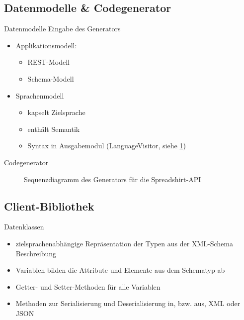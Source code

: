 \subsection{Datenmodelle \& Codegenerator}
\begin{frame}{Datenmodelle}
    Eingabe des Generators
    \begin{itemize}
        \item Applikationsmodell:
        \begin{itemize}
            \item REST-Modell
            \item Schema-Modell
        \end{itemize}
        \item Sprachenmodell
        \begin{itemize}
            \item kapselt Zielsprache
            \item enthält Semantik
            \item Syntax in Ausgabemodul (LanguageVisitor, siehe \cref{sequence})
        \end{itemize}
    \end{itemize}
\end{frame}

\begin{frame}{Codegenerator}
    \begin{figure}
        \resizebox{\textwidth}{!}{
            
        }
        \caption{Sequenzdiagramm des Generators für die Spreadshirt-API}
        \label{sequence}
    \end{figure}
\end{frame}

\subsection{Client-Bibliothek}
\begin{frame}{Datenklassen}
    \begin{itemize}
        \item zielsprachenabhängige Repräsentation der Typen aus der XML-Schema Beschreibung
        \item Variablen bilden die Attribute und Elemente aus dem Schematyp ab
        \item Getter- und Setter-Methoden für alle Variablen
        \item Methoden zur Serialisierung und Deserialisierung in, bzw. aus, XML oder JSON
    \end{itemize}
\end{frame}


